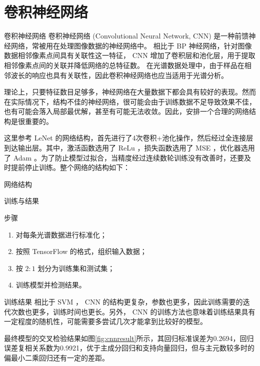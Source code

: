 \documentclass[11pt]{beamer}
\begin{document}
	\section{卷积神经网络}
	\begin{frame}{卷积神经网络}
		卷积神经网络 (Convolutional Neural Network, CNN) 是一种前馈神经网络，常被用在处理图像数据的神经网络中。
		相比于 BP 神经网络，针对图像数据相邻像素点间具有关联性这一特征， CNN 增加了卷积层和池化层，用于提取相邻像素点间的关联并降低网络的总特征数。
		在光谱数据处理中，由于样品在相邻波长的响应也具有关联性，因此卷积神经网络也应当适用于光谱分析。
	\end{frame}
	\begin{frame}
			理论上，只要特征数目足够多，神经网络在大量数据下都会具有较好的表现。然而在实际情况下，结构不佳的神经网络，很可能会由于训练数据不足导致效果不佳，也有可能会落入局部最优解，甚至有可能无法收敛。因此，安排一个合理的网络结构是很重要的。
			
			这里参考 LeNet 的网络结构，首先进行了4次卷积+池化操作，然后经过全连接层到达输出层。其中，激活函数选用了 ReLu ，损失函数选用了 MSE ，优化器选用了 Adam 。为了防止模型过拟合，当精度经过连续数轮训练没有改善时，还要及时提前停止训练。整个网络的结构如下：
	\end{frame}
	\begin{frame}{网络结构}
		\centering
		\scalebox{0.7}{}
	\end{frame}
	\begin{frame}{训练与结果}
		\begin{block}{步骤}
			\begin{enumerate}
				\item 对每条光谱数据进行标准化；
				\item 按照 TensorFlow 的格式，组织输入数据；
				\item 按 $2:1$ 划分为训练集和测试集；
				\item 训练模型并检测结果。
			\end{enumerate}
		\end{block}
		\begin{block}{训练结果}
			相比于 SVM ， CNN 的结构更复杂，参数也更多，因此训练需要的迭代次数也更多，训练时间也更长。另外， CNN 的训练方法也意味着训练结果具有一定程度的随机性，可能需要多尝试几次才能拿到比较好的模型。
			
			最终模型的交叉检验结果如图\ref{fig:cnnresult}所示，其回归标准误差为0.2694，回归误差复相关系数为0.9921，优于主成分回归和支持向量回归，但与主元数较多时的偏最小二乘回归还有一定的差距。
		\end{block}
	\end{frame}
\end{document}
